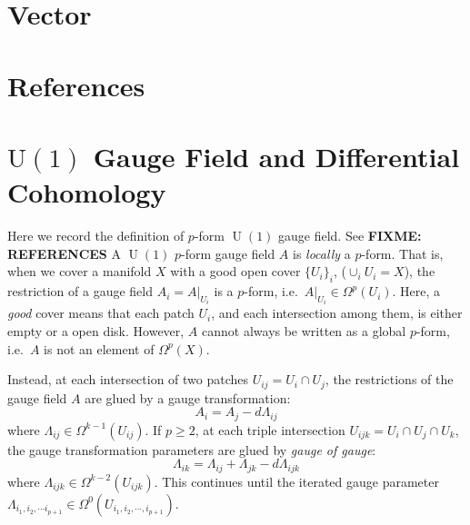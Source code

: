 \documentclass[11pt,toc=bibliography]{scrbook}
\DeclareMathOperator{\U}{U}
\numberwithin{equation}{section}
\DeclareMathOperator{\U}{U}
\begin{document}

\chapter{Vector}\label{sec-vector}


\chapter*{References}\label{references}


\printbibliography[heading=none]

\cleardoublepage
{}
{}
\appendix

\chapter{\texorpdfstring{\(\mathrm{U}(1)\) Gauge Field and Differential
Cohomology}{\textbackslash mathrm\{U\}(1) Gauge Field and Differential Cohomology}}\label{sec-app-gauge-field}

Here we record the definition of \(p\)-form \(\U(1)\) gauge field. See
\textbf{FIXME: REFERENCES} A \(\U(1)\) \(p\)-form gauge field \(A\) is
\emph{locally} a \(p\)-form. That is, when we cover a manifold \(X\)
with a good open cover \(\{U_i\}_i\), (\(\cup_i U_i = X\)), the
restriction of a gauge field \(A_i = A|_{U_i}\) is a \(p\)-form,
i.e.~\(A|_{U_i} \in \Omega^p(U_i)\). Here, a \emph{good} cover means
that each patch \(U_i\), and each intersection among them, is either
empty or a open disk. However, \(A\) cannot always be written as a
global \(p\)-form, i.e.~\(A\) is not an element of \(\Omega^{p}(X)\).

Instead, at each intersection of two patches \(U_{ij} = U_i \cap U_j\),
the restrictions of the gauge field \(A\) are glued by a gauge
transformation: \[
A_{i} = A_{j} - d\Lambda_{ij}
\] where \(\Lambda_{ij} \in \Omega^{k-1}(U_{ij})\). If \(p\ge 2\), at
each triple intersection \(U_{ijk} = U_i \cap U_j \cap U_k\), the gauge
transformation parameters are glued by \emph{gauge of gauge}: \[
\Lambda_{ik} = \Lambda_{ij} + \Lambda_{jk} - d\Lambda_{ijk}
\] where \(\Lambda_{ijk}\in \Omega^{k-2}(U_{ijk})\). This continues
until the iterated gauge parameter
\(\Lambda_{i_1,i_2,\cdots i_{p+1}} \in \Omega^0(U_{i_1,i_2,\cdots,i_{p+1}})\).
\end{document}
